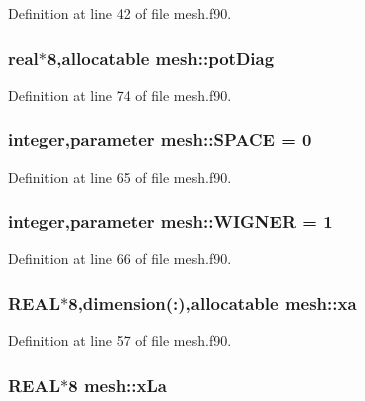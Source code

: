 Definition at line 42 of file mesh.f90.

\hypertarget{namespacemesh_a6e7109b1ed1096ce6c3dbacaa4920158}{
\subsubsection[{potDiag}]{\setlength{\rightskip}{0pt plus 5cm}real$\ast$8,allocatable {\bf mesh::potDiag}}}
\label{namespacemesh_a6e7109b1ed1096ce6c3dbacaa4920158}


Definition at line 74 of file mesh.f90.

\hypertarget{namespacemesh_a0c6bae5d6531a6b0f0428c0c056f759d}{
\subsubsection[{SPACE}]{\setlength{\rightskip}{0pt plus 5cm}integer,parameter {\bf mesh::SPACE} = 0}}
\label{namespacemesh_a0c6bae5d6531a6b0f0428c0c056f759d}


Definition at line 65 of file mesh.f90.

\hypertarget{namespacemesh_a4e989d120872f8573cf4454bfc6a0d31}{
\subsubsection[{WIGNER}]{\setlength{\rightskip}{0pt plus 5cm}integer,parameter {\bf mesh::WIGNER} = 1}}
\label{namespacemesh_a4e989d120872f8573cf4454bfc6a0d31}


Definition at line 66 of file mesh.f90.

\hypertarget{namespacemesh_af9469b274e48a8fcc34f1c8df7976271}{
\subsubsection[{xa}]{\setlength{\rightskip}{0pt plus 5cm}REAL$\ast$8,dimension(:),allocatable {\bf mesh::xa}}}
\label{namespacemesh_af9469b274e48a8fcc34f1c8df7976271}


Definition at line 57 of file mesh.f90.

\hypertarget{namespacemesh_a7b0412308700e4488efc480ace9412b8}{
\subsubsection[{xLa}]{\setlength{\rightskip}{0pt plus 5cm}REAL$\ast$8 {\bf mesh::xLa}}}
\label{namespacemesh_a7b0412308700e4488efc480ace9412b8}


